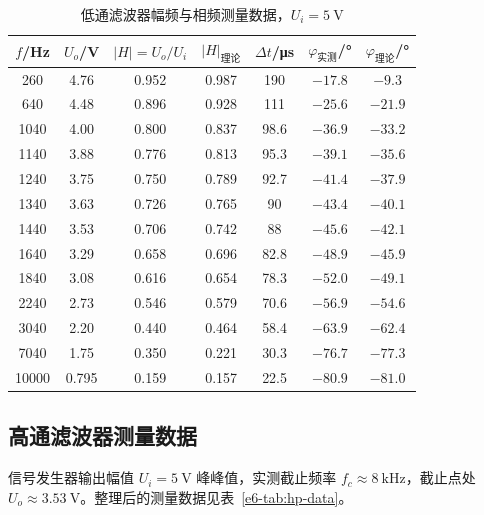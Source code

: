 \begin{table}[H]
    \centering
    \caption{低通滤波器幅频与相频测量数据，\(U_i=\SI{5}{\volt}\)}
    \label{e6-tab:lp-data}
    \small
    \begin{tabular}{ccccccc}
        \toprule
        \(f\)/Hz & \(U_o\)/V & \(|H|=U_o/U_i\) & \(|H|_{\text{理论}}\) & \(\Delta t\)/\si{\micro\second} & \(\varphi_{\text{实测}}\)/° & \(\varphi_{\text{理论}}\)/° \\
        \midrule
        260    & 4.76 & 0.952 & 0.987 & 190   & \(-17.8\) & \(-9.3\) \\
        640    & 4.48 & 0.896 & 0.928 & 111   & \(-25.6\) & \(-21.9\) \\
        1040   & 4.00 & 0.800 & 0.837 & 98.6  & \(-36.9\) & \(-33.2\) \\
        1140   & 3.88 & 0.776 & 0.813 & 95.3  & \(-39.1\) & \(-35.6\) \\
        1240   & 3.75 & 0.750 & 0.789 & 92.7  & \(-41.4\) & \(-37.9\) \\
        1340   & 3.63 & 0.726 & 0.765 & 90    & \(-43.4\) & \(-40.1\) \\
        1440   & 3.53 & 0.706 & 0.742 & 88    & \(-45.6\) & \(-42.1\) \\
        1640   & 3.29 & 0.658 & 0.696 & 82.8  & \(-48.9\) & \(-45.9\) \\
        1840   & 3.08 & 0.616 & 0.654 & 78.3  & \(-52.0\) & \(-49.1\) \\
        2240   & 2.73 & 0.546 & 0.579 & 70.6  & \(-56.9\) & \(-54.6\) \\
        3040   & 2.20 & 0.440 & 0.464 & 58.4  & \(-63.9\) & \(-62.4\) \\
        7040   & 1.75 & 0.350 & 0.221 & 30.3  & \(-76.7\) & \(-77.3\) \\
        10000  & 0.795 & 0.159 & 0.157 & 22.5  & \(-80.9\) & \(-81.0\) \\
        \bottomrule
    \end{tabular}
\end{table}

\subsection{高通滤波器测量数据}

信号发生器输出幅值 \(U_i=\SI{5}{\volt}\) 峰峰值，实测截止频率 \(f_c\approx\SI{8}{\kilo\hertz}\)，截止点处 \(U_o\approx\SI{3.53}{\volt}\)。整理后的测量数据见表~\ref{e6-tab:hp-data}。

